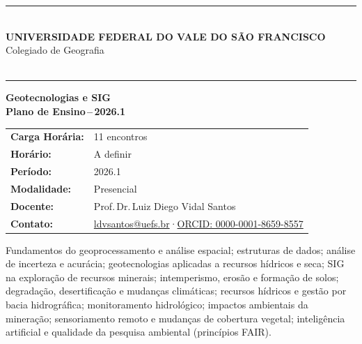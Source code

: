 \documentclass[11pt,a4paper]{article}
\begin{document}
\thispagestyle{empty}




\begin{center}
\color{uefsdark}\rule{\textwidth}{1.2pt}\\[0.30cm]
{\Large\bfseries UNIVERSIDADE FEDERAL DO VALE DO SÃO FRANCISCO}\\[0.15cm]
{\normalsize Colegiado de Geografia}\\[0.06cm]
{\normalsize }\\[0.30cm]
\color{uefsdark}\rule{\textwidth}{1.2pt}
\end{center}

\vspace{0.6cm}

\begin{center}
{\LARGE\bfseries\color{uefsdark} Geotecnologias e SIG}\\[0.30cm]
{\large\bfseries Plano de Ensino\,--\,2026.1}
\end{center}

\vspace{0.4cm}

\begin{tcolorbox}[uefsbox]
\renewcommand{\arraystretch}{1.25}
\begin{tabularx}{\textwidth}{@{}l X@{}}
\textbf{Carga Horária:} & 11 encontros \\
\textbf{Horário:} & A definir \\
\textbf{Período:} & 2026.1 \\
\textbf{Modalidade:} & Presencial \\
\textbf{Docente:} & Prof.\,Dr.\,Luiz Diego Vidal Santos \\
\textbf{Contato:} & \href{mailto:ldvsantos@uefs.br}{ldvsantos@uefs.br}\enspace·\enspace\href{https://orcid.org/0000-0001-8659-8557}{ORCID: 0000-0001-8659-8557} \\
\end{tabularx}
\end{tcolorbox}

\vspace{0.3cm}



\begin{tcolorbox}[ementabox]
Fundamentos do geoprocessamento e análise espacial; estruturas de dados; análise de incerteza e acurácia; geotecnologias aplicadas a recursos hídricos e seca; SIG na exploração de recursos minerais; intemperismo, erosão e formação de solos; degradação, desertificação e mudanças climáticas; recursos hídricos e gestão por bacia hidrográfica; monitoramento hidrológico; impactos ambientais da mineração; sensoriamento remoto e mudanças de cobertura vegetal; inteligência artificial e qualidade da pesquisa ambiental (princípios FAIR).
\end{tcolorbox}
\end{document}
